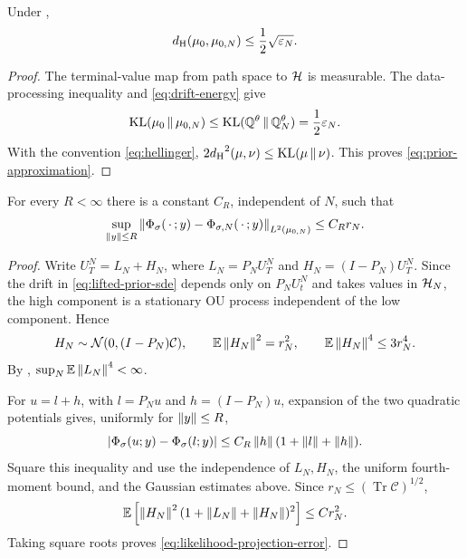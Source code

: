 \begin{lemma}
\label{lem:prior-approximation}
Under ,
\begin{equation}
  {d_{\mathrm{H}}}({\mu_{0}},\mu_{0,N})\leq\frac12\sqrt{\varepsilon_N}.
  \label{eq:prior-approximation}
\end{equation}
\end{lemma}

\begin{proof}
The terminal-value map from path space to $\mathcal{H}$ is measurable.  The
data-processing inequality and \eqref{eq:drift-energy} give
\[
  \operatorname{KL}({\mu_{0}}\,\|\,\mu_{0,N})
  \leq
  \operatorname{KL}(\mathbb Q^\theta\,\|\,\mathbb Q_N^\theta)
  =\frac12\varepsilon_N.
\]
With the convention \eqref{eq:hellinger},
$2{d_{\mathrm{H}}}^2(\mu,\nu)\leq\operatorname{KL}(\mu\,\|\,\nu)$.  This proves
\eqref{eq:prior-approximation}.
\end{proof}

\begin{lemma}
\label{lem:likelihood-projection}
For every $R<\infty$ there is a constant $C_R$, independent of $N$,
such that
\begin{equation}
  \sup_{\left\lVert y\right\rVert\leq R}
  \left\lVert
    \Phi_{\sigma}(\,\cdot\,;y)
    -\Phi_{\sigma,N}(\,\cdot\,;y)
  \right\rVert_{L^2(\mu_{0,N})}
  \leq C_R r_N.
  \label{eq:likelihood-projection-error}
\end{equation}
\end{lemma}

\begin{proof}
Write $U_T^N=L_N+H_N$, where
$L_N=P_NU_T^N$ and $H_N=(I-P_N)U_T^N$.  Since the drift in
\eqref{eq:lifted-prior-sde} depends only on $P_NU_t^N$ and takes
values in $\mathcal{H}_N$, the high component is a stationary OU process
independent of the low component.  Hence
\[
  H_N\sim\mathcal N(0,(I-P_N)\mathcal C),\qquad
  \mathbb E\left\lVert H_N\right\rVert^2=r_N^2,\qquad
  \mathbb E\left\lVert H_N\right\rVert^4\leq3r_N^4.
\]
By ,
$\sup_N\mathbb E\left\lVert L_N\right\rVert^4<\infty$.

For $u=l+h$, with $l=P_Nu$ and $h=(I-P_N)u$, expansion of the two
quadratic potentials gives, uniformly for $\left\lVert y\right\rVert\leq R$,
\begin{equation}
  \left\lvert
    \Phi_{\sigma}(u;y)-\Phi_{\sigma}(l;y)
  \right\rvert
  \leq C_R\left\lVert h\right\rVert(1+\left\lVert l\right\rVert+\left\lVert h\right\rVert).
  \label{eq:potential-projection-pointwise}
\end{equation}
Square this inequality and use the independence of $L_N,H_N$, the
uniform fourth-moment bound, and the Gaussian estimates above.  Since
$r_N\leq(\operatorname{Tr}\mathcal C)^{1/2}$,
\[
  \mathbb E
  \left[
    \left\lVert H_N\right\rVert^2(1+\left\lVert L_N\right\rVert+\left\lVert H_N\right\rVert)^2
  \right]
  \leq C r_N^2.
\]
Taking square roots proves
\eqref{eq:likelihood-projection-error}.
\end{proof}


